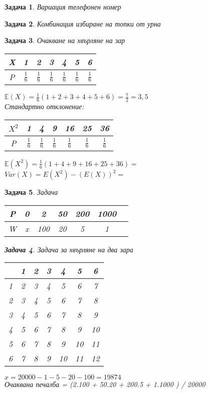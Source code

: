 \documentclass{article}
\newtheorem{problem}{Задача}
\begin{document}
	
	\begin{problem}
		Вариация телефонен номер
	\end{problem}
	
		\begin{problem}
		Комбинация избиране на топки от урна
	\end{problem}

		\begin{problem}
			Очакване на хвърляне на зар
			\begin{tabular}{|c|c c c c c c|} 
				\hline
				X & 1 & 2 & 3 & 4 & 5 & 6 \\ 
				\hline
				P & $\frac{1}{6}$ & $\frac{1}{6}$ & $\frac{1}{6}$ & $\frac{1}{6}$ & $\frac{1}{6}$ & $\frac{1}{6}$  \\ 
				\hline
			\end{tabular}
		\newline
		$\mathbb E(X) = \frac{1}{6}(1+2+3+4+5+6) = \frac{7}{2} = 3,5 $ \\
		Стандартно отклонение:
		\begin{tabular}{|c|c c c c c c|} 
			\hline
			$X^2$ & 1 & 4 & 9 & 16 & 25 & 36 \\ 
			\hline
			P & $\frac{1}{6}$ & $\frac{1}{6}$ & $\frac{1}{6}$ & $\frac{1}{6}$ & $\frac{1}{6}$ & $\frac{1}{6}$  \\ 
			\hline
		\end{tabular}
	\newline
		$\mathbb E(X^2) = \frac{1}{6}(1+4+9+16+25+36) = $ \\
		$ Var(X) = E(X^2) - (E(X))^2 =  $
	\end{problem}
	
	
	\begin{problem}
	Задача
		\begin{tabular}{|c|c c c c c c||} 
		\hline
		P&	0& 2&  50&  200&  1000&  \\
		\hline
		W&	x& 100&  20&  5&  1&  \\
		\hline
	\end{tabular}

\begin{problem}
	Задача за хвърляне на два зара
	\begin{tabular}{|c|c c c c c c|}
	  & 1 & 2 & 3 & 4 & 5 & 6 \\
		\hline
	 1  & 2 & 3 & 4 & 5 & 6 & 7 \\
	2 &	 3 & 4 & 5 & 6 & 7 & 8 \\
	3 &	4 & 5 & 6 & 7 & 8 & 9 \\
4 &		 5 & 6 & 7 & 8 & 9 & 10 \\
5 &	6 & 7 & 8 & 9 & 10 & 11 \\
6 &	7 & 8 & 9 & 10 & 11 & 12 \\

\end{tabular}
	
\end{problem}
	
	$ x = 20000- 1-5-20-100 = 19874$\\
	
	
	Очаквана печалба = (2.100 + 50.20 + 200.5 + 1.1000 ) / 20000 \\
	\end{problem}
	
\end{document}
